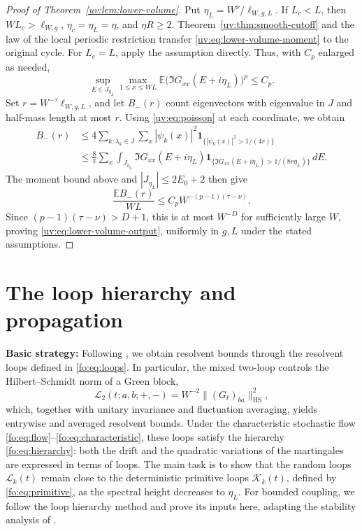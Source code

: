 \documentclass[11pt]{article}
\numberwithin{equation}{section}
\theoremstyle{remark}
\newcommand{\E}{\mathbb E}
\newcommand{\ellscale}{\ell_{W,g}}
\newcommand{\ellstar}{\ell_{W,g,L}}
\newcommand{\cL}{\mathcal L}
\newcommand{\cK}{\mathcal K}
\newcommand{\HS}{\mathrm{HS}}
\newcommand{\one}{\mathbf 1}
\begin{document}
\begin{proof}[Proof of Theorem~\ref{uv:lem:lower-volume}]
Put $\eta_L=W^\nu/\ellstar$. If $L_c<L$, then $WL_c>\ellscale$,
$\eta_c=\eta_L=\eta$, and $\eta R\ge2$. Theorem~\ref{uv:thm:smooth-cutoff}
and the law of the local periodic restriction transfer
\eqref{uv:eq:lower-volume-moment} to the original cycle. For $L_c=L$,
apply the assumption directly. Thus, with $C_p$ enlarged as needed,
\[
 \sup_{E\in J_{\eta_L}}\max_{1\le x\le WL}
 \E\bigl(\Im G_{xx}(E+i\eta_L)\bigr)^p\le C_p.
\]
Set $r=W^{-\tau}\ellstar$, and let $B_-(r)$ count eigenvectors
with eigenvalue in $J$ and half-mass length at most $r$.
Using \eqref{uv:eq:poisson} at each coordinate, we obtain
\[
 \begin{aligned}
 B_-(r)&\le4\sum_{k:\lambda_k\in J}\sum_x
 |\psi_k(x)|^2\one_{\{|\psi_k(x)|^2>1/(4r)\}}\\
 &\le\frac8\pi\sum_x\int_{J_{\eta_L}}
 \Im G_{xx}(E+i\eta_L)
 \one_{\{\Im G_{xx}(E+i\eta_L)>1/(8r\eta_L)\}}\,dE.
 \end{aligned}
\]
The moment bound above and $|J_{\eta_L}|\le2E_0+2$ then give
\[
 \frac{\E B_-(r)}{WL}\le C_p W^{-(p-1)(\tau-\nu)}.
\]
Since $(p-1)(\tau-\nu)>D+1$,
this is at most $W^{-D}$ for sufficiently large $W$, proving
\eqref{uv:eq:lower-volume-output}, uniformly in $g,L$ under the
stated assumptions.
\end{proof}

\section{The loop hierarchy and propagation}
\label{sec:flow-overview}
{\bf Basic strategy:} Following \cite{YY,TYY}, we obtain resolvent bounds through the resolvent
loops defined in \eqref{fo:eq:loops}. In particular, the mixed two-loop
controls the Hilbert--Schmidt norm of a Green block,
\[
 \cL_2(t;a,b;+,-)=W^{-2}\|(G_t)_{ba}\|_{\HS}^2,
\]
which, together with unitary invariance and fluctuation averaging, yields
entrywise and averaged resolvent bounds. Under the characteristic stochastic
flow \eqref{fo:eq:flow}--\eqref{fo:eq:characteristic}, these loops satisfy the
hierarchy \eqref{fo:eq:hierarchy}: both the drift and the quadratic variations
of the martingales are expressed in terms of loops. The main task is to show
that the random loops $\cL_k(t)$ remain close to the deterministic primitive
loops $\cK_k(t)$, defined by \eqref{fo:eq:primitive}, as the spectral height
decreases to $\eta_L$. For bounded coupling, we follow the loop
hierarchy method and prove its inputs here, adapting the stability analysis of
\cite[Section~8 and Appendix~B.1]{DYYY}.
\end{document}
